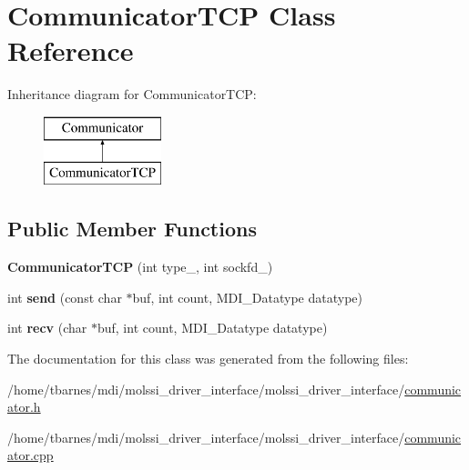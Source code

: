 \hypertarget{classCommunicatorTCP}{\section{Communicator\-T\-C\-P Class Reference}
\label{classCommunicatorTCP}
}
Inheritance diagram for Communicator\-T\-C\-P\-:\begin{figure}[H]
\begin{center}
\leavevmode
\includegraphics[height=2.000000cm]{classCommunicatorTCP}
\end{center}
\end{figure}
\subsection*{Public Member Functions}
\begin{DoxyCompactItemize}
\item 
\hypertarget{classCommunicatorTCP_a62b8536c01d0e5d3c7ab38df98a9a873}{{\bfseries Communicator\-T\-C\-P} (int type\-\_\-, int sockfd\-\_\-)}\label{classCommunicatorTCP_a62b8536c01d0e5d3c7ab38df98a9a873}

\item 
\hypertarget{classCommunicatorTCP_ac8e4894a12e34596ec7e78ab875933bf}{int {\bfseries send} (const char $\ast$buf, int count, M\-D\-I\-\_\-\-Datatype datatype)}\label{classCommunicatorTCP_ac8e4894a12e34596ec7e78ab875933bf}

\item 
\hypertarget{classCommunicatorTCP_a69d90c24e7bee5736c634565bdebab0d}{int {\bfseries recv} (char $\ast$buf, int count, M\-D\-I\-\_\-\-Datatype datatype)}\label{classCommunicatorTCP_a69d90c24e7bee5736c634565bdebab0d}

\end{DoxyCompactItemize}


The documentation for this class was generated from the following files\-:\begin{DoxyCompactItemize}
\item 
/home/tbarnes/mdi/molssi\-\_\-driver\-\_\-interface/molssi\-\_\-driver\-\_\-interface/\hyperlink{communicator_8h}{communicator.\-h}\item 
/home/tbarnes/mdi/molssi\-\_\-driver\-\_\-interface/molssi\-\_\-driver\-\_\-interface/\hyperlink{communicator_8cpp}{communicator.\-cpp}\end{DoxyCompactItemize}
